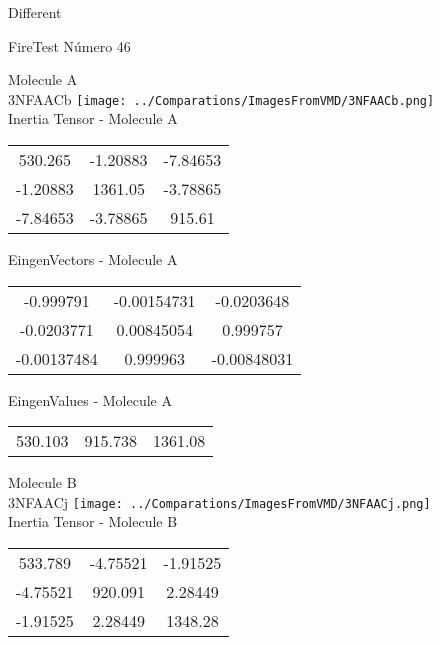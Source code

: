 \begin{center}
\vtab
\vtab
\textcolor{NavyBlue}{\Large Different}
\end{center}

 \newpage

\vtab[-2cm]
\begin{center}
{\large FireTest \tab Número 46}
\end{center}
\begin{multicols}{2}
\begin{center}

Molecule A \\ 
3NFAACb
\texttt{[image: ../Comparations/ImagesFromVMD/3NFAACb.png]}
\\
Inertia Tensor - Molecule A \\
\vtab

\begin{tabular}{|c c c|}
530.265	 & 	-1.20883	 & 	-7.84653	 \\
-1.20883	 & 	1361.05	 & 	-3.78865	 \\
-7.84653	 & 	-3.78865	 & 	915.61
\end{tabular}

\vtab
 EingenVectors - Molecule A     \\
\vtab
\begin{tabular}{|c c c|}
-0.999791	 & 	-0.00154731	 & 	-0.0203648	 \\
-0.0203771	 & 	0.00845054	 & 	0.999757	 \\
-0.00137484	 & 	0.999963	 & 	-0.00848031
\end{tabular}

\vtab
 EingenValues - Molecule A     \\
\vtab
\begin{tabular}{|c c c|}
530.103	 & 	915.738	 & 	1361.08	 \\
\end{tabular}
\columnbreak

Molecule B \\ 
3NFAACj
\texttt{[image: ../Comparations/ImagesFromVMD/3NFAACj.png]}
\\
Inertia Tensor - Molecule B \\
\vtab

\begin{tabular}{|c c c|}
533.789	 & 	-4.75521	 & 	-1.91525	 \\
-4.75521	 & 	920.091	 & 	2.28449	 \\
-1.91525	 & 	2.28449	 & 	1348.28
\end{tabular}


\end{center}
\end{multicols}
